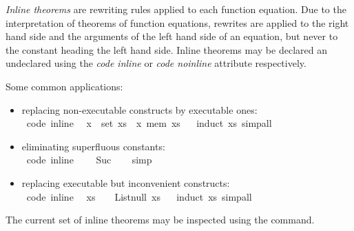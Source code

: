 \begin{isabellebody}
\begin{isamarkuptext}
  \emph{Inline theorems} are rewriting rules applied to each
  function equation.  Due to the interpretation of theorems
  of function equations, rewrites are applied to the right
  hand side and the arguments of the left hand side of an
  equation, but never to the constant heading the left hand side.
  Inline theorems may be declared an undeclared using the
  \emph{code inline} or \emph{code noinline} attribute respectively.

  Some common applications:%
\end{isamarkuptext}%
\isamarkuptrue%
%
\begin{itemize}
     \item replacing non-executable constructs by executable ones: \\
\isamarkupfalse%
\ {\isacharbrackleft}code\ inline{\isacharbrackright}{\isacharcolon}\isanewline
\ \ {\isachardoublequoteopen}x\ {\isasymin}\ set\ xs\ {\isasymlongleftrightarrow}\ x\ mem\ xs{\isachardoublequoteclose}%
\isadelimproof
\ %
\endisadelimproof
%
\isatagproof
{}\isamarkupfalse%
\ {\isacharparenleft}induct\ xs{\isacharparenright}\ simp{\isacharunderscore}all%
\endisatagproof
{\isafoldproof}%
%
\isadelimproof
%
\endisadelimproof
%
\item eliminating superfluous constants: \\
\isamarkupfalse%
\ {\isacharbrackleft}code\ inline{\isacharbrackright}{\isacharcolon}\isanewline
\ \ {\isachardoublequoteopen}{}\ {\isacharequal}\ Suc\ {}{\isachardoublequoteclose}%
\isadelimproof
\ %
\endisadelimproof
%
\isatagproof
{}\isamarkupfalse%
\ simp%
\endisatagproof
{\isafoldproof}%
%
\isadelimproof
%
\endisadelimproof
%
\item replacing executable but inconvenient constructs: \\
\isamarkupfalse%
\ {\isacharbrackleft}code\ inline{\isacharbrackright}{\isacharcolon}\isanewline
\ \ {\isachardoublequoteopen}xs\ {\isacharequal}\ {\isacharbrackleft}{\isacharbrackright}\ {\isasymlongleftrightarrow}\ List{\isachardot}null\ xs{\isachardoublequoteclose}%
\isadelimproof
\ %
\endisadelimproof
%
\isatagproof
{}\isamarkupfalse%
\ {\isacharparenleft}induct\ xs{\isacharparenright}\ simp{\isacharunderscore}all%
\endisatagproof
{\isafoldproof}%
%
\isadelimproof
%
\endisadelimproof
%
\end{itemize}
%
\begin{isamarkuptext}%
The current set of inline theorems may be inspected using
  the \isa{{\isasymPRINTCODETHMS}} command.


\end{isamarkuptext}
\end{isabellebody}
